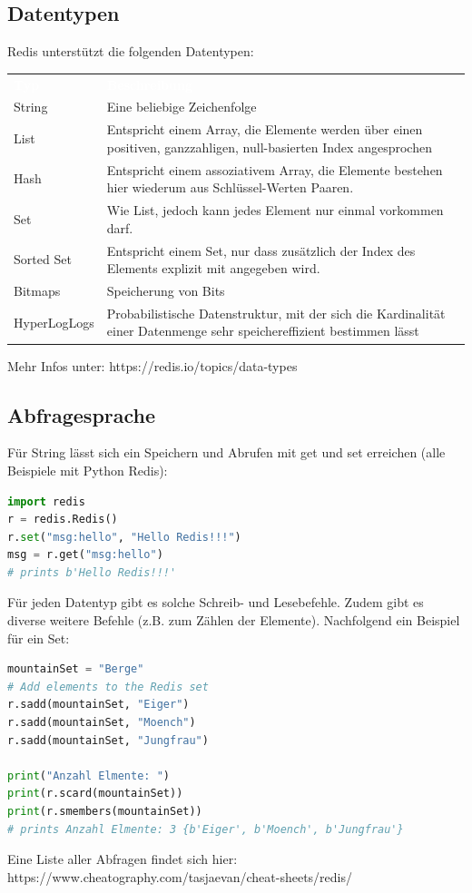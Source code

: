 \subsection{Datentypen}
Redis unterstützt die folgenden Datentypen:
\begin{table}[H]
	\begin{tabular}{|p{3cm}|p{12.7cm}|}
		\hline
		\rowcolor{black}
		\textcolor{white}{\textbf{Typ}} &
		\textcolor{white}{\textbf{Beschreibung}}\\
		
		String & Eine beliebige Zeichenfolge\\ 
		\hline
		List & Entspricht einem Array, die Elemente werden über einen positiven, ganzzahligen, null-basierten Index angesprochen \\
		\hline 
		Hash & Entspricht einem assoziativem Array, die Elemente bestehen hier wiederum aus Schlüssel-Werten Paaren.\\
		\hline 
		Set & Wie List, jedoch kann jedes Element nur einmal vorkommen darf.\\
		\hline 
		Sorted Set & Entspricht einem Set, nur dass zusätzlich der Index des Elements explizit mit angegeben wird.\\
		\hline 
		Bitmaps & Speicherung von Bits\\
		\hline 
		HyperLogLogs & Probabilistische Datenstruktur, mit der sich die Kardinalität einer Datenmenge sehr speichereffizient bestimmen lässt\\
		\hline
	\end{tabular}
\end{table}
Mehr Infos unter: https://redis.io/topics/data-types
\subsection{Abfragesprache}
Für String lässt sich ein Speichern und Abrufen mit get und set erreichen (alle Beispiele mit Python Redis):
\begin{lstlisting}[language=python]
import redis
r = redis.Redis()
r.set("msg:hello", "Hello Redis!!!")
msg = r.get("msg:hello")
# prints b'Hello Redis!!!'
\end{lstlisting}

Für jeden Datentyp gibt es solche Schreib- und Lesebefehle. Zudem gibt es diverse weitere Befehle (z.B. zum Zählen der Elemente). Nachfolgend ein Beispiel für ein Set:
\begin{lstlisting}[language=python]
mountainSet = "Berge"
# Add elements to the Redis set
r.sadd(mountainSet, "Eiger")
r.sadd(mountainSet, "Moench")
r.sadd(mountainSet, "Jungfrau")

print("Anzahl Elmente: ")
print(r.scard(mountainSet))
print(r.smembers(mountainSet))
# prints Anzahl Elmente: 3 {b'Eiger', b'Moench', b'Jungfrau'}
\end{lstlisting}
Eine Liste aller Abfragen findet sich hier: https://www.cheatography.com/tasjaevan/cheat-sheets/redis/
